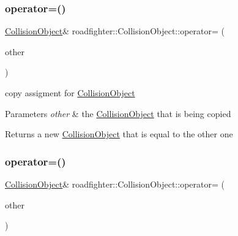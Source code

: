 \subsubsection{\texorpdfstring{operator=()}{operator=()}\hspace{0.1cm}{\footnotesize\ttfamily [1/2]}}
{\footnotesize\ttfamily \hyperlink{classroadfighter_1_1CollisionObject}{Collision\+Object}\& roadfighter\+::\+Collision\+Object\+::operator= (\begin{DoxyParamCaption}\item[{const \hyperlink{classroadfighter_1_1CollisionObject}{Collision\+Object} \&}]{other }\end{DoxyParamCaption})\hspace{0.3cm}{\ttfamily [default]}}

copy assigment for \hyperlink{classroadfighter_1_1CollisionObject}{Collision\+Object} 
\begin{DoxyParams}{Parameters}
{\em other} & the \hyperlink{classroadfighter_1_1CollisionObject}{Collision\+Object} that is being copied \\
\hline
\end{DoxyParams}
\begin{DoxyReturn}{Returns}
a new \hyperlink{classroadfighter_1_1CollisionObject}{Collision\+Object} that is equal to the other one 
\end{DoxyReturn}
\mbox{\label{classroadfighter_1_1CollisionObject_a68b62353ad431b65f2dbacee983b6660}} 
\subsubsection{\texorpdfstring{operator=()}{operator=()}\hspace{0.1cm}{\footnotesize\ttfamily [2/2]}}
{\footnotesize\ttfamily \hyperlink{classroadfighter_1_1CollisionObject}{Collision\+Object}\& roadfighter\+::\+Collision\+Object\+::operator= (\begin{DoxyParamCaption}\item[{\hyperlink{classroadfighter_1_1CollisionObject}{Collision\+Object} \&\&}]{other }\end{DoxyParamCaption})\hspace{0.3cm}{\ttfamily [default]}}

